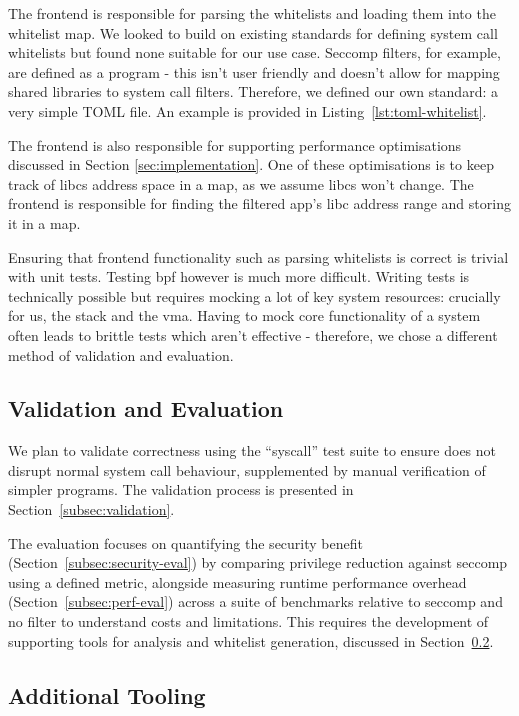 The frontend is responsible for parsing the \af whitelists and loading them into
the whitelist map. We looked to build on existing standards for defining
system call whitelists but found none suitable for our use case. Seccomp filters,
for example, are defined as a  program - this isn't user friendly and
doesn't allow for mapping shared libraries to system call filters. Therefore, we defined our
own standard: a very simple TOML file. An example is provided in
Listing~\ref{lst:toml-whitelist}.

The frontend is also responsible for supporting performance optimisations
discussed in Section \ref{sec:implementation}. One of these optimisations is
to keep track of \acp{libc} address space in a map, as we assume \acp{libc} won't
change. The frontend is responsible for finding the filtered app's \ac{libc}
address range and storing it in a map.

Ensuring that frontend functionality such as parsing whitelists is correct is
trivial with unit tests. Testing \ac{bpf} however is much more difficult.
Writing tests is technically possible but requires mocking a lot of key system
resources: crucially for us, the stack and the \ac{vma}. Having to mock core
functionality of a system often leads to brittle tests which aren't effective -
therefore, we chose a different method of validation and evaluation.

\subsection{Validation and Evaluation}

We plan to validate correctness using the  ``syscall'' test
suite to ensure \af does not disrupt normal system call behaviour, supplemented
by manual verification of simpler programs. The validation process is presented
in Section~\ref{subsec:validation}.

The evaluation focuses on quantifying the security benefit
(Section~\ref{subsec:security-eval}) by comparing privilege reduction
against seccomp using a defined metric, alongside measuring runtime
performance overhead (Section~\ref{subsec:perf-eval}) across a suite of
benchmarks relative to seccomp and no filter to understand costs and
limitations. This requires the development of supporting tools for analysis
and whitelist generation, discussed in 
Section~\ref{subsubsec:additional-tooling}.

\subsection{Additional Tooling}\label{subsubsec:additional-tooling}

